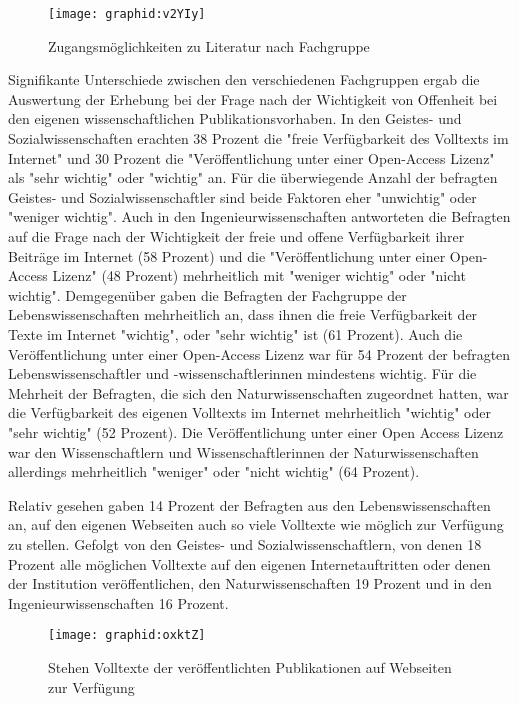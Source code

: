 \begin{figure}[h!]
\texttt{[image: graphid:v2YIy]}
\caption{Zugangsmöglichkeiten zu Literatur nach Fachgruppe}
\end{figure}

Signifikante Unterschiede zwischen den verschiedenen Fachgruppen ergab die Auswertung der Erhebung bei der Frage nach der Wichtigkeit von Offenheit bei den eigenen wissenschaftlichen Publikationsvorhaben. In den Geistes- und Sozialwissenschaften erachten 38 Prozent die "freie Verfügbarkeit des Volltexts im Internet" und 30 Prozent die "Veröffentlichung unter einer Open-Access Lizenz" als "sehr wichtig" oder "wichtig" an. Für die überwiegende Anzahl der befragten Geistes- und Sozialwissenschaftler sind beide Faktoren eher "unwichtig" oder "weniger wichtig". Auch in den Ingenieurwissenschaften antworteten die Befragten auf die Frage nach der Wichtigkeit der freie und offene Verfügbarkeit ihrer Beiträge im Internet (58 Prozent) und die "Veröffentlichung unter einer Open-Access Lizenz" (48 Prozent) mehrheitlich mit "weniger wichtig" oder "nicht wichtig". Demgegenüber gaben die Befragten der Fachgruppe der Lebenswissenschaften mehrheitlich an, dass ihnen die freie Verfügbarkeit der Texte im Internet "wichtig", oder "sehr wichtig" ist (61 Prozent). Auch die Veröffentlichung unter einer Open-Access Lizenz war für 54 Prozent der befragten Lebenswissenschaftler und -wissenschaftlerinnen mindestens wichtig. Für die Mehrheit der Befragten, die sich den Naturwissenschaften zugeordnet hatten, war die Verfügbarkeit des eigenen Volltexts im Internet mehrheitlich "wichtig" oder "sehr wichtig" (52 Prozent). Die Veröffentlichung unter einer Open Access Lizenz war den Wissenschaftlern und Wissenschaftlerinnen der Naturwissenschaften allerdings mehrheitlich "weniger" oder "nicht wichtig" (64 Prozent).

Relativ gesehen gaben 14 Prozent der Befragten aus den Lebenswissenschaften an, auf den eigenen Webseiten auch so viele Volltexte wie möglich zur Verfügung zu stellen. Gefolgt von den Geistes- und Sozialwissenschaftlern, von denen 18 Prozent alle möglichen Volltexte auf den eigenen Internetauftritten oder denen der Institution veröffentlichen, den Naturwissenschaften 19 Prozent und in den Ingenieurwissenschaften 16 Prozent.

\begin{figure}[h!]
\texttt{[image: graphid:oxktZ]}
\caption{Stehen Volltexte der veröffentlichten Publikationen auf Webseiten zur Verfügung}
\end{figure}

